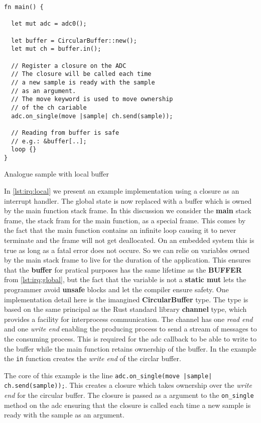 \begin{listing}[H]
  \begin{verbatim}
fn main() {

  let mut adc = adc0();

  let buffer = CircularBuffer::new();
  let mut ch = buffer.in();

  // Register a closure on the ADC
  // The closure will be called each time
  // a new sample is ready with the sample
  // as an argument.
  // The move keyword is used to move ownership
  // of the ch cariable
  adc.on_single(move |sample| ch.send(sample));

  // Reading from buffer is safe
  // e.g.: &buffer[..];
  loop {}
}
  \end{verbatim}
  \caption{Analogue sample with local buffer}
  \label{lst:irq:local}
\end{listing}

In \autoref{lst:irq:local} we present an example implementation using a closure as an interrupt handler.
The global state is now replaced with a buffer which is owned by the main function stack frame.
In this discussion we consider the \textbf{main} stack frame, the stack fram for the main function, as a special frame.
This comes by the fact that the main function contains an infinite loop causing it to never terminate and the frame will not get deallocated.
On an embedded system this is true as long as a fatal error does not occure.
So we can relie on variables owned by the main stack frame to live for the duration of the application.
This ensures that the \textbf{buffer} for pratical purposes has the same lifetime as the \textbf{BUFFER} from \autoref{lst:irq:global}, but the fact that the variable is not a \textbf{static mut} lets the programmer avoid \textbf{unsafe} blocks and let the compiler ensure safety.
One implementation detail here is the imangined \textbf{CircularBuffer} type.
The type is based on the same principal as the Rust standard library \textbf{channel} type, which provides a facility for interprocess communication.
The channel has one \textit{read end} and one \textit{write end} enabling the producing process to send a stream of messages to the consuming process.
This is required for the \gls{adc} callback to be able to write to the buffer while the main function retains ownership of the buffer.
In the example the \texttt{in} function creates the \textit{write end} of the circlar buffer.

The core of this example is the line \texttt{adc.on\_single(move |sample| ch.send(sample));}.
This creates a closure which takes ownership over the \textit{write end} for the circular buffer.
The closure is passed as a argument to the \texttt{on\_single} method on the \gls{adc} ensuring that the closure is called each time a new sample is ready with the sample as an argument.

